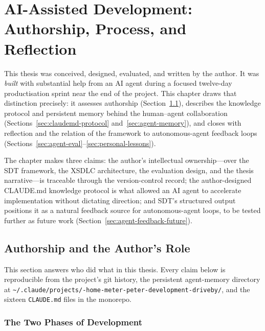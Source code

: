 \chapter{AI-Assisted Development: Authorship, Process, and Reflection}
\label{ch:ai-development}

This thesis was conceived, designed, evaluated, and written by the author. It was \emph{built} with substantial help from an AI agent during a focused twelve-day productisation sprint near the end of the project. This chapter draws that distinction precisely: it assesses authorship (Section~\ref{sec:authorship}), describes the knowledge protocol and persistent memory behind the human--agent collaboration (Sections~\ref{sec:claudemd-protocol} and~\ref{sec:agent-memory}), and closes with reflection and the relation of the framework to autonomous-agent feedback loops (Sections~\ref{sec:agent-eval}--\ref{sec:personal-lessons}).

The chapter makes three claims: the author's intellectual ownership---over the SDT framework, the XSDLC architecture, the evaluation design, and the thesis narrative---is traceable through the version-control record; the author-designed CLAUDE.md knowledge protocol is what allowed an AI agent to accelerate implementation without dictating direction; and SDT's structured output positions it as a natural feedback source for autonomous-agent loops, to be tested further as future work (Section~\ref{sec:agent-feedback-future}).

\section{Authorship and the Author's Role}
\label{sec:authorship}

This section answers who did what in this thesis. Every claim below is reproducible from the project's git history, the persistent agent-memory directory at \texttt{\textasciitilde/.claude/\allowbreak projects/\allowbreak -home-meter-peter-\allowbreak development-driveby/}, and the sixteen \texttt{CLAUDE.md} files in the monorepo.

\subsection{The Two Phases of Development}
\label{subsec:two-phases}

